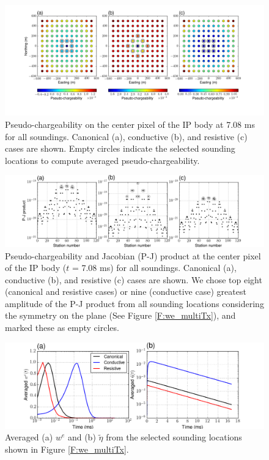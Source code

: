 \documentclass[a4paper, 11pt]{article}
\newcommand{\peta}{\tilde{\eta}}
\begin{document}
\begin{figure}[htb]
  \centering  \includegraphics[width=1.0\textwidth]{figures/threecasesavg/Peta_multiTx.png}
  \caption{Pseudo-chargeability on the center pixel of the IP body at 7.08 ms for all soundings. Canonical (a), conductive (b), and resistive (c) cases are shown. Empty circles indicate the selected sounding locations to compute averaged pseudo-chargeability.}
  \label{F:Peta_multiTx}
\end{figure}
\begin{figure}[htb]
  \centering  \includegraphics[height=0.2\textheight]{figures/threecasesavg/PJproduct.png}
  \caption{Pseudo-chargeability and Jacobian (P-J) product at the center pixel of the IP body ($t$ = 7.08 ms) for all soundings. Canonical (a), conductive (b), and resistive (c) cases are shown. We chose top eight (canonical and resistive cases) or nine (conductive case) greatest amplitude of the P-J product from all sounding locations considering the symmetry on the plane (See Figure \ref{F:we_multiTx}), and marked these as empty circles. }
  \label{F:PJproduct}
\end{figure}

\begin{figure}[htb]
  \centering \includegraphics[height=0.2\textheight]{figures/threecasesavg/AvgWeandPeta.png}
  \caption{Averaged (a) $w^e$ and (b) $\peta$ from the selected sounding locations shown in Figure \ref{F:we_multiTx}.}
  \label{F:AvgWeandPeta}
\end{figure}
\end{document}
